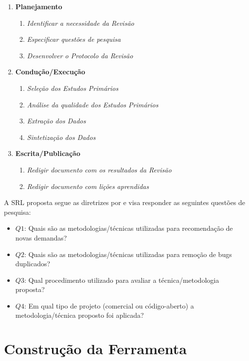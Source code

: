 \documentclass[msc,proposal,hidelot,hideabstract]{ppgccufmg} %
\begin{document}
\begin{enumerate}
  \item \textbf{Planejamento}
  \begin{enumerate}
    \item \textit{Identificar a necessidade da Revisão}
    \item \textit{Especificar questões de pesquisa}
    \item \textit{Desenvolver o Protocolo da Revisão}
  \end{enumerate}
  \item \textbf{Condução/Execução}
  \begin{enumerate}
    \item \textit{Seleção dos Estudos Primários}
    \item \textit{Análise da qualidade dos Estudos Primários}
     \item \textit{Extração dos Dados}
     \item \textit{Sintetização dos Dados}
   \end{enumerate}
  \item \textbf{Escrita/Publicação}
  \begin{enumerate}
    \item \textit{Redigir documento com os resultados da Revisão}
    \item \textit{Redigir documento com lições aprendidas}
  \end{enumerate}
\end{enumerate}

A SRL proposta segue as diretrizes por
\cite{keele2007guidelines} e visa responder as seguintes questões de
pesquisa:

\begin{itemize}
  \item \textbf{$Q1$}: Quais são as metodologias/técnicas utilizadas para
    recomendação de novas demandas?
  \item \textbf{$Q2$}: Quais são as metodologias/técnicas utilizadas para
    remoção de bugs duplicados?
    \item \textbf{$Q3$}: Qual procedimento utilizado para avaliar a
    técnica/metodologia proposta?
  \item \textbf{$Q4$}: Em qual tipo de projeto (comercial ou código-aberto) a
    metodologia/técnica proposto foi aplicada?
\end{itemize}

\section{Construção da Ferramenta}
\label{sec:prova-conceito}
\end{document}

